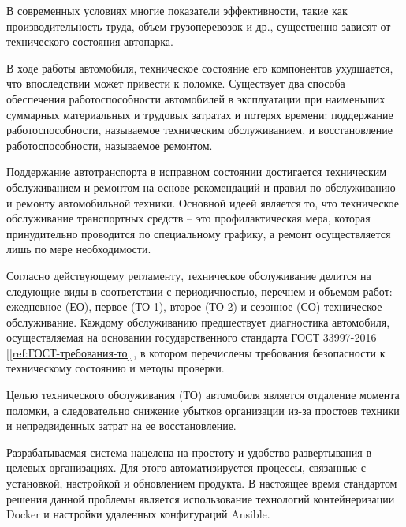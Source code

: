 
В современных условиях многие показатели эффективности, такие как
производительность труда, объем грузоперевозок и др., существенно зависят от
технического состояния автопарка.

В ходе работы автомобиля, техническое состояние его компонентов ухудшается, что
впоследствии может привести к поломке. Существует два способа обеспечения работоспособности
автомобилей в эксплуатации при наименьших суммарных материальных и трудовых
затратах и потерях времени: поддержание работоспособности, называемое
техническим обслуживанием, и восстановление работоспособности, называемое
ремонтом.

Поддержание автотранспорта в исправном состоянии достигается техническим
обслуживанием и ремонтом на основе рекомендаций и правил по обслуживанию и
ремонту автомобильной техники. Основной идеей является то, что техническое
обслуживание транспортных средств -- это профилактическая мера, которая
принудительно проводится по специальному графику, а ремонт осуществляется лишь
по мере необходимости.

Согласно действующему регламенту, техническое обслуживание делится на следующие
виды в соответствии с периодичностью, перечнем и объемом работ: ежедневное
(ЕО), первое (ТО-1), второе (ТО-2) и сезонное (СО) техническое обслуживание.
Каждому обслуживанию предшествует диагностика автомобиля, осуществляемая на
основании государственного стандарта ГОСТ 33997-2016
[\ref{ref:ГОСТ-требования-то}], в котором перечислены требования безопасности к
техническому состоянию и методы проверки.

Целью технического обслуживания (ТО) автомобиля является отдаление момента
поломки, а следовательно снижение убытков организации из-за простоев техники и
непредвиденных затрат на ее восстановление.

Разрабатываемая система нацелена на простоту и удобство развертывания в целевых
организациях. Для этого автоматизируется процессы, связанные с установкой,
настройкой и обновлением продукта. В настоящее время стандартом решения данной
проблемы является использование технологий контейнеризации Docker и настройки
удаленных конфигураций Ansible.
